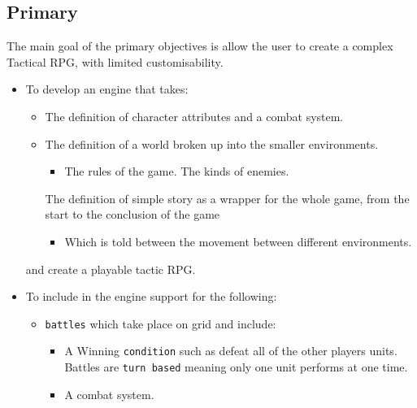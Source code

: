 \subsection{Primary}
\label{primary}
The main goal of the primary objectives is allow the user to create a complex Tactical RPG, with limited customisability.  
\begin{itemize}
\item To develop an engine that takes:
\begin{itemize}

 \item The definition of character attributes and a combat system.
	\item The definition of a world broken up into the smaller environments.
	\begin{itemize}
		\item The rules of the game.
		\tick The kinds of enemies.
	\end{itemize}
	
	\tick The definition of simple story as a wrapper for the whole game, from the start to the conclusion of the game
	\begin{itemize}
		\item Which is told between the movement between different environments.
	\end{itemize}
	                        
\end{itemize}
and create a playable tactic RPG.

\item To include in the engine support for the following:

\begin{itemize}
	\tick \texttt{units} with a fixed set of associated attributes such as:
	\begin{itemize}
		\tick Hit-points (which represent the health of the unit).
		\tick Strength.
		\tick Defence.
		\tick Move (The number of tiles the unit can move each turn).
	\end{itemize}
	
	\item \texttt{battles} which take place on grid and include:
	\begin{itemize}
		\tick  A set number of \texttt{units} for each player.
		\item  A Winning \texttt{condition} such as defeat all of the other players units.
		\tick  Battles are \texttt{turn based} meaning only one unit performs at one time.   
		\item  A combat system. \marginpar{\textbf{Nearly}}
	\end{itemize}
	

\end{itemize}
\end{itemize}
